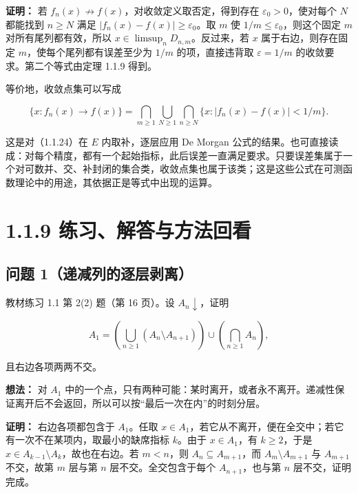 \documentclass[11pt,a4paper]{article}
\begin{document}
\textbf{证明：} 若 \(f_n(x)\not\to f(x)\)，对收敛定义取否定，得到存在
\(\varepsilon_0>0\)，使对每个 \(N\) 都能找到 \(n\ge N\) 满足
\(|f_n(x)-f(x)|\ge\varepsilon_0\)。取 \(m\) 使
\(1/m\le\varepsilon_0\)，则这个固定 \(m\) 对所有尾列都有效，所以
\(x\in\limsup_n D_{n,m}\)。反过来，若 \(x\) 属于右边，则存在固定
\(m\)，使每个尾列都有误差至少为 \(1/m\) 的项，直接违背取
\(\varepsilon=1/m\) 的收敛要求。第二个等式由定理 1.1.9 得到。

等价地，收敛点集可以写成

\begin{equation*}
\{x:f_n(x)\to f(x)\}
=\bigcap_{m\ge1}\bigcup_{N\ge1}\bigcap_{n\ge N}
\{x:|f_n(x)-f(x)|<1/m\}.
\tag{1.1.25}
\end{equation*}

这是对（1.1.24）在 \(E\) 内取补，逐层应用 De Morgan
公式的结果。也可直接读成：对每个精度，都有一个起始指标，此后误差一直满足要求。只要误差集属于一个对可数并、交、补封闭的集合类，收敛点集也属于该类；这是这些公式在可测函数理论中的用途，其依据正是等式中出现的运算。

\clearpage
\section[\S{}1.1.9
练习、解答与方法回看]{1.1.9
练习、解答与方法回看}\label{ux7ec3ux4e60ux89e3ux7b54ux4e0eux65b9ux6cd5ux56deux770b}

\subsection{问题
1（递减列的逐层剥离）}\label{ux95eeux9898-1ux9012ux51cfux5217ux7684ux9010ux5c42ux5265ux79bb}

教材练习 1.1 第 2(2) 题（第 16 页）。设 \(A_n\downarrow\)，证明

\begin{equation*}
A_1=\left(\bigcup_{n\ge1}(A_n\setminus A_{n+1})\right)
\cup\left(\bigcap_{n\ge1}A_n\right),
\tag{1.1.26}
\end{equation*}

且右边各项两两不交。

\textbf{想法：} 对 \(A_1\)
中的一个点，只有两种可能：某时离开，或者永不离开。递减性保证离开后不会返回，所以可以按``最后一次在内''的时刻分层。

\textbf{证明：} 右边各项都包含于 \(A_1\)。任取
\(x\in A_1\)，若它从不离开，便在全交中；若它有一次不在某项内，取最小的缺席指标
\(k\)。由于 \(x\in A_1\)，有 \(k\ge2\)，于是
\(x\in A_{k-1}\setminus A_k\)，故也在右边。若 \(m<n\)，则
\(A_n\subseteq A_{m+1}\)，而 \(A_m\setminus A_{m+1}\) 与 \(A_{m+1}\)
不交，故第 \(m\) 层与第 \(n\) 层不交。全交包含于每个 \(A_{n+1}\)，也与第
\(n\) 层不交，证明完成。
\end{document}
